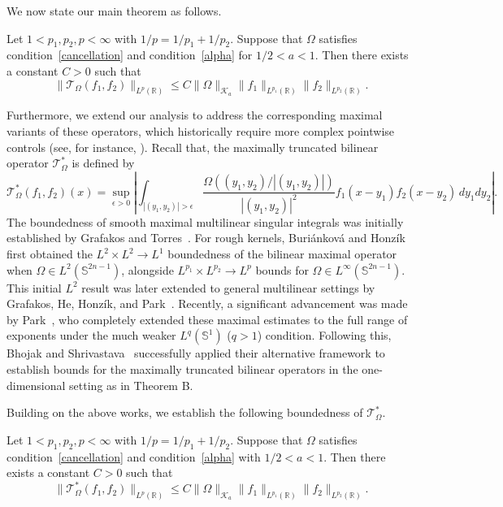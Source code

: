 \documentclass[11pt]{amsart}
\begin{document}
We now state our main theorem as follows.

\begin{theorem}\label{thmmain}
	Let $1 < p_1, p_2, p < \infty$ with $1/p = 1/p_1 + 1/p_2$.
	Suppose that $\Omega$ satisfies condition~\eqref{cancellation} and	condition~\eqref{alpha} for $1/2 < a < 1$.
	Then there exists a constant $C > 0$ such that
	\[
	\|\mathcal {T}_\Omega(f_1, f_2)\|_{L^p(\mathbb{R})} \leq C\|\Omega\|_{\mathcal{K}_a}\|f_1\|_{L^{p_1}(\mathbb{R})}\|f_2\|_{L^{p_2}(\mathbb{R})}.
	\]
\end{theorem}

Furthermore, we extend our analysis to address the corresponding maximal variants of these operators, which historically require more complex pointwise controls (see, for instance, \cite{BH19, Par25}). Recall that, the maximally truncated bilinear operator $\mathcal {T}_\Omega^*$ is defined by
\[
\mathcal {T}_\Omega^*(f_1, f_2)(x) = \sup_{\epsilon>0} \left| \int_{|(y_1, y_2)|
	> \epsilon} \frac{\Omega((y_1, y_2)/|(y_1, y_2)|)}{|(y_1, y_2)|^2} f_1(x-y_1) f_2(x-y_2) \, dy_1 dy_2 \right|.
\]
The boundedness of smooth maximal multilinear singular integrals was initially established by Grafakos and Torres~\cite{GT2002_maximal}. For rough kernels, Buri\'ankov\'a and Honz\'ik~\cite{BH19} first obtained the $L^2 \times L^2 \to L^1$ boundedness of the bilinear maximal operator when $\Omega \in L^2(\mathbb{S}^{2n-1})$, alongside $L^{p_1} \times L^{p_2} \to L^p$ bounds for $\Omega \in L^\infty(\mathbb{S}^{2n-1})$. This initial $L^2$ result was later extended to general multilinear settings by Grafakos, He, Honz\'ik, and Park~\cite{GHHP2024}. Recently, a significant advancement was made by Park~\cite{Par25}, who completely extended these maximal estimates to the full range of exponents under the much weaker $L^q(\mathbb{S}^1) $ ($q>1$) condition.
Following this, Bhojak and Shrivastava~\cite{bhojak2025alternate} successfully applied their alternative framework to establish bounds for the maximally truncated bilinear operators in the one-dimensional setting as in Theorem B. 

Building on the above works, we establish the following boundedness of $\mathcal {T}_\Omega^*$.

\begin{theorem}\label{thmtrunc}
	Let $1 < p_1, p_2, p < \infty$ with $1/p = 1/p_1 + 1/p_2$.
	Suppose that $\Omega$ satisfies condition~\eqref{cancellation} and condition~\eqref{alpha} with $1/2 < a < 1$.
	Then there exists a constant $C > 0$ such that
	\[
	\|\mathcal {T}_\Omega^*(f_1, f_2)\|_{L^p(\mathbb{R})} \le C \|\Omega\|_{\mathcal{K}_a} \|f_1\|_{L^{p_1}(\mathbb{R})} \|f_2\|_{L^{p_2}(\mathbb{R})}.
	\]
\end{theorem}
\end{document}
